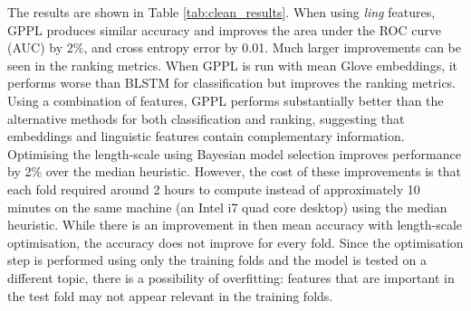 The results are shown in Table \ref{tab:clean_results}. When using \emph{ling} features,
GPPL produces similar accuracy and improves the area under the ROC curve (AUC) by 2\%,
and cross entropy error by 0.01. Much larger improvements can be seen in the ranking metrics. 
When GPPL is run with mean Glove embeddings, it performs worse than
BLSTM for classification but improves the ranking metrics. Using a combination of features,
GPPL performs substantially better than the alternative methods for both classification and
ranking, suggesting that embeddings and linguistic features contain complementary information.
Optimising the length-scale using Bayesian model selection improves performance by 2\% over the median heuristic. 
However, the cost of these improvements is that each fold required around 2 hours to compute instead of approximately 10 minutes on the same machine (an Intel i7 quad core desktop) using the median heuristic. 
While there is an improvement in then mean accuracy with length-scale optimisation, 
the accuracy does not improve for every fold.
Since the optimisation step is performed using only the training folds and the model is tested 
on a different topic, there is a possibility of overfitting: features that are important in the 
test fold may not appear relevant in the training folds. 

